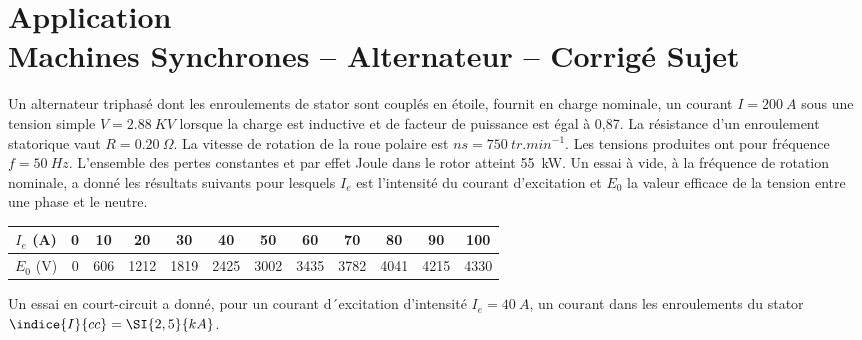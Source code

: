 \chapter*{Application  \\ 
Machines Synchrones -- Alternateur
-- \ifprof Corrigé \else Sujet \fi}

\iflivret {} \else
\ifprof  {} \else \fi
\fi

\setcounter{question}{0}


Un alternateur triphasé dont les enroulements de stator sont couplés en étoile, fournit en charge nominale, un courant $I = \SI{200}{A}$ sous une tension simple $V = \SI{2,88}{KV}$ lorsque la charge est inductive et de facteur de puissance est égal à 0,87. 
La résistance d’un enroulement statorique vaut $R = \SI{0,20}{\Omega}$. 
La vitesse de rotation de la roue polaire est $ns = \SI{750}{tr.min^{-1}}$.
Les tensions produites ont pour fréquence $f = \SI{50}{Hz}$. 
L’ensemble des pertes constantes et par effet Joule dans le rotor atteint \SI{55}{kW}. 
Un essai à vide, à la fréquence de rotation nominale, a donné les résultats suivants pour lesquels $I_e$ est l’intensité du courant d’excitation et $E_0$ la valeur efficace de la tension entre une phase et le neutre.


\begin{center}
\begin{tabular}{*{12}{c}}
\hline
$I_e$ (\si{A}) 	& 0	&10	& 20	& 30	& 40	& 50	& 60	& 70	& 80	& 90	& 100	\\
\hline
$E_0$ (\si{V})	& 0	& 606	& 1212	& 1819	& 2425	& 3002	& 3435	& 3782	& 4041	& 4215	& 4330	\\
\hline
\end{tabular}
\end{center}

Un essai en court-circuit a donné, pour un courant d´excitation d’intensité $I_e=\SI{40}{A}$, un courant dans les enroulements du stator $\indice{I}{cc}=\SI{2,5}{kA}$.

\ifprof
\begin{corrige}

\end{corrige}
\else
\fi

